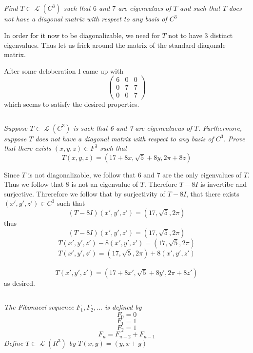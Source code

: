 \documentclass[11pt,oneside,titlepage]{book}
\DeclareMathOperator \map {\mathcal {L}}
\begin{document}
\subsection{}

\textit{Find $T \in \map(C^3)$ such that $6$ and $7$ are eigenvalues of $T$ and such that
  $T$ does not have a diagonal matrix with respect to any basis of $C^3$}

In order for it now to be diagonalizable, we need for $T$ not to have 3 distinct eigenvalues. Thus
let us frick around the matrix of the standard diagonale matrix.

After some deloberation I came up with
$$
\begin{pmatrix}
  6 & 0 & 0 \\
  0 & 7 & 7 \\
  0 & 0 & 7
\end{pmatrix}
$$
which seems to satisfy the desired properties.

\subsection{}

\textit{Suppose $T \in \map(C^3)$ is such that 6 and 7 are eigenvalueus of $T$. Furthermore,
  suppose $T$ does not have a diagonal matrix with respect to any basis of $C^3$. Prove that
  there exists $(x, y, z) \in F^3$ such that
  $$T(x, y, z) = (17 + 8x, \sqrt{5} + 8y, 2\pi + 8z)$$}

Since $T$ is not diagonalizable, we follow that 6 and 7 are the only eigenvalues of $T$. Thus we
follow that $8$ is not an eigenvalue of $T$. Therefore $T - 8I$ is invertibe and surjective.
Threrefore we follow that by surjectivity of $T - 8I$, that there exists $(x', y', z') \in C^3$
such that
$$(T - 8I)(x', y', z') = (17, \sqrt{5}, 2\pi)$$
thus
$$(T - 8I)(x', y', z') = (17, \sqrt{5}, 2\pi)$$
$$T(x', y', z') - 8(x', y', z') = (17, \sqrt{5}, 2\pi)$$
$$T(x', y', z') = (17, \sqrt{5}, 2\pi) + 8(x', y', z')$$\
$$T(x', y', z') = (17 + 8x', \sqrt{5} + 8y', 2\pi + 8z')$$
as desired.

\subsection{}

\textit{The Fibonacci sequence $F_1, F_2, ...$ is defined by}
$$F_0 = 0$$
$$F_1 = 1$$
$$F_2 = 1$$
$$F_n = F_{n - 2} + F_{n - 1}$$
\textit{Define $T \in \map(R^3)$ by $T(x, y) = (y, x + y)$}
\end{document}
